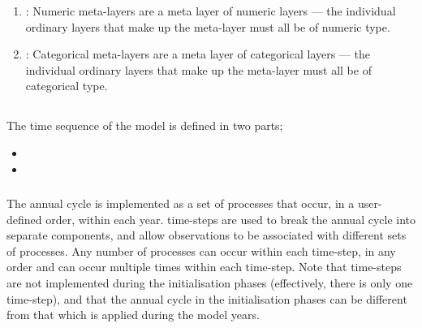 \begin{enumerate}
\begin{enumerate}

\item {\label{numeric meta-layer}}: Numeric meta-layers are a meta layer of numeric layers --- the individual ordinary layers that make up the meta-layer must all be of numeric type. 

\item {\label{categorical meta-layer}}:  Categorical meta-layers are a meta layer of categorical layers --- the individual ordinary layers that make up the meta-layer must all be of categorical type.

\end{enumerate}
\end{enumerate}

\subsection{}

The time sequence of the model is defined in two parts;
\begin{itemize}
  \item {}
  \item {}
\end{itemize}

\subsubsection{}

The annual cycle is implemented as a set of processes that occur, in a user-defined order, within each year. time-steps are used to break the annual cycle into separate components, and allow observations to be associated with different sets of processes. Any number of processes can occur within each time-step, in any order and can occur multiple times within each time-step. Note that time-steps are not implemented during the initialisation phases (effectively, there is only one time-step), and that the annual cycle in the initialisation phases can be different from that which is applied during the model years.

\subsubsection{}


